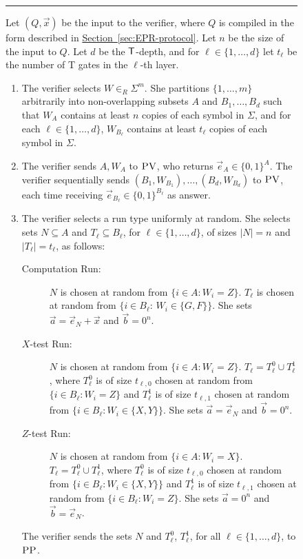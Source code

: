 \documentclass[11pt]{article}
\numberwithin{equation}{section}
\theoremstyle{definition}
\theoremstyle{plain}
\newcommand{\expref}[2]{\hyperref[#2]{#1~\ref{#2}}}
\newcommand{\pv}{\textsc{PV}}
\newcommand{\pp}{\textsc{PP}}
\begin{document}
\begin{figure}[H]
\rule{\textwidth}{0.5pt}
\vspace{-0.5cm}   %
\justify 
Let $(Q,\vec{x})$ be the input to the verifier, where $Q$ is compiled in the form described in \expref{Section}{sec:EPR-protocol}. Let $n$ be the size of the input to $Q$. Let $d$ be the $\sf T$-depth, and for $\ell\in\{1,\ldots,d\}$ let $t_\ell$ be the number of {\sf T} gates in the $\ell$-th layer. 
\begin{enumerate}
\itemsep=-2.5pt   %
\item The verifier selects $W \in_R\Sigma^{m}$. She partitions $\{1,\ldots,m\}$ arbitrarily into non-overlapping subsets $A$ and $B_1,\ldots,B_d$ such that $W_A$ contains at least $n$ copies of each symbol in $\Sigma$, and for each $\ell\in\{1,\ldots,d\}$, $W_{B_\ell}$ contains at least $t_\ell$ copies of each symbol in $\Sigma$.
\item The verifier sends $A,W_A$ to $\pv$, who returns $\vec{e}_A \in \{0,1\}^A$. The verifier sequentially sends  $(B_1,W_{B_1}),\ldots,(B_d,W_{B_d})$ to $\pv$, each time receiving $\vec{e}_{B_\ell}\in \{0,1\}^{B_\ell}$ as answer. 
\item The verifier selects a run type uniformly at random. She selects sets $N \subseteq A$ and  $T_\ell \subseteq B_\ell$, for $\ell\in\{1,\ldots,d\}$, of sizes $|N|=n$ and $|T_\ell|=t_\ell$, as follows:
\begin{description}
\item[Computation Run:] $N$ is chosen at random from 
$\{i\in A: W_i=Z\}$. $T_\ell$ is chosen at random from $\{i\in B_\ell:\,W_i\in \{G,F\}\}$. 
She sets $\vec{a} = \vec{e}_N + \vec{x}$ and $\vec{b} = 0^n$.
\item[$X$-test Run:] $N$ is chosen at random from 
$\{i\in A:W_i=Z\}$. $T_\ell = T_\ell^0 \cup T_\ell^1$, where $T_\ell^0$ is of size $t_{\ell,0}$ chosen at random from $\{i\in B_\ell:W_i=Z\}$ and $T_\ell^1$ is of size $t_{\ell,1}$ chosen at random from $\{i\in B_\ell:W_i\in \{X,Y\}\}$.
She sets $\vec{a} = \vec{e}_N$ and $\vec{b} = 0^n$.
\item[$Z$-test Run:] $N$ is chosen at random from 
$\{i\in A:W_i=X\}$. $T_\ell = T_\ell^0 \cup T_\ell^1$, where $T_\ell^0$ is of size $t_{\ell,0}$ chosen at random from $\{i\in B_\ell:W_i\in\{X,Y\}\}$ and $T_\ell^1$ is of size $t_{\ell,1}$ chosen at random from $\{i\in B_\ell:W_i=Z\}$.
She sets $\vec{a} = 0^n$ and $\vec{b} = \vec{e}_N$.
\end{description}
The verifier sends the sets $N$ and $T_\ell^0$, $T_\ell^1$, for all $\ell\in\{1,\ldots,d\}$, to $\pp$.

\end{enumerate}
\end{figure}
\end{document}
